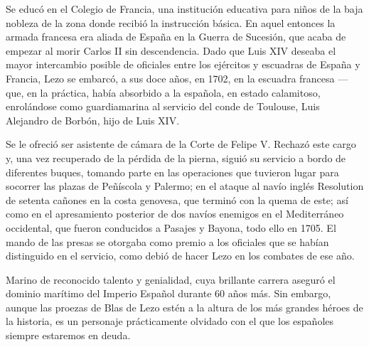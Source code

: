 Se educó en el Colegio de Francia, una institución educativa para
niños de la baja nobleza de la zona donde recibió la instrucción
básica. En aquel entonces la armada francesa 
era aliada de España en la Guerra de Sucesión, que acaba de empezar al
morir Carlos II sin descendencia. Dado que Luis XIV deseaba el mayor
intercambio posible de oficiales entre los ejércitos y escuadras de
España y Francia, Lezo se embarcó, a sus doce años, en 1702, en la
escuadra francesa ---que, en la práctica, había absorbido a la
española, en estado calamitoso, enrolándose como guardiamarina al
servicio del conde de Toulouse, Luis Alejandro de Borbón, hijo de Luis
XIV.

Se le ofreció ser asistente de cámara de la Corte de Felipe V. Rechazó
este cargo y, una vez recuperado de la pérdida de la pierna, siguió su
servicio a bordo de diferentes buques, tomando parte en las
operaciones que tuvieron lugar para socorrer las plazas de Peñíscola y
Palermo; en el ataque al navío inglés Resolution de setenta cañones
en la costa genovesa, que terminó con la quema de este; así como en
el apresamiento posterior de dos navíos enemigos en el Mediterráneo
occidental, que fueron conducidos a Pasajes y Bayona, todo ello en
1705. El mando de las presas se otorgaba como premio a los oficiales
que se habían distinguido en el servicio, como debió de hacer Lezo en
los combates de ese año.

Marino de reconocido talento y genialidad, cuya brillante carrera
aseguró el dominio marítimo del Imperio Español durante 60 años
más. Sin embargo, aunque las proezas de Blas de Lezo estén a la altura
de los más grandes héroes de la historia, es un personaje
prácticamente olvidado con el que los españoles siempre estaremos en
deuda.